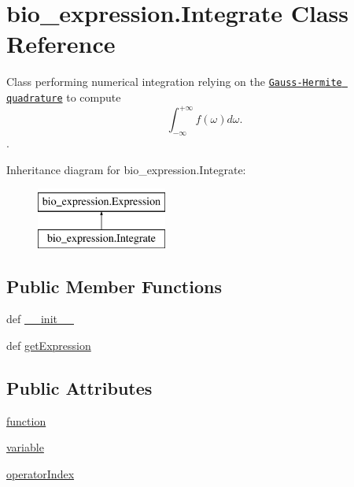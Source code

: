 \hypertarget{classbio__expression_1_1_integrate}{\section{bio\+\_\+expression.\+Integrate Class Reference}
\label{classbio__expression_1_1_integrate}
}


Class performing numerical integration relying on the \href{http://en.wikipedia.org/wiki/Gaussian_quadrature}{\tt Gauss-\/\+Hermite quadrature} to compute \[ \int_{-\infty}^{+\infty} f(\omega) d\omega. \].  


Inheritance diagram for bio\+\_\+expression.\+Integrate\+:\begin{figure}[H]
\begin{center}
\leavevmode
\includegraphics[height=2.000000cm]{d2/dd1/classbio__expression_1_1_integrate}
\end{center}
\end{figure}
\subsection*{Public Member Functions}
\begin{DoxyCompactItemize}
\item 
def \hyperlink{classbio__expression_1_1_integrate_a0ce66b3a16e295afdb7c6f0819f46d6d}{\+\_\+\+\_\+init\+\_\+\+\_\+}
\item 
def \hyperlink{classbio__expression_1_1_integrate_a1aff67b31caf78c898f342ccc4c52a80}{get\+Expression}
\end{DoxyCompactItemize}
\subsection*{Public Attributes}
\begin{DoxyCompactItemize}
\item 
\hyperlink{classbio__expression_1_1_integrate_aa0b26e5e7ef188bddbbbac6d2734eb1e}{function}
\item 
\hyperlink{classbio__expression_1_1_integrate_a8aa2ae870cce644d72a76ecae5497121}{variable}
\item 
\hyperlink{classbio__expression_1_1_integrate_ae6f4e73d2daf792fc223e12b205c4904}{operator\+Index}
\end{DoxyCompactItemize}



